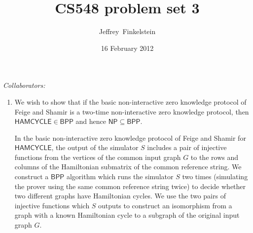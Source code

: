 \documentclass[draft]{article}
\author{Jef{}frey~Finkelstein}
\date{16 February 2012}
\title{CS548 problem set 3}
\newcommand{\collaborators}[1]{\emph{Collaborators: #1}}
\newcommand{\class}[1]{{\ensuremath{\mathsf{#1}}}}
\newcommand{\lang}[1]{{\ensuremath{\mathsf{#1}}}}
\newcommand{\BPP}{\class{BPP}}
\newcommand{\NP}{\class{NP}}
\begin{document}
\maketitle
\collaborators{}
\begin{enumerate}
\item
  We wish to show that if the basic non-interactive zero knowledge protocol of Feige and Shamir is a two-time non-interactive zero knowledge protocol, then $\lang{HAMCYCLE}\in\BPP$ and hence $\NP\subseteq\BPP$.

  In the basic non-interactive zero knowledge protocol of Feige and Shamir for \lang{HAMCYCLE}, the output of the simulator $S$ includes a pair of injective functions from the vertices of the common input graph $G$ to the rows and columns of the Hamiltonian submatrix of the common reference string.
  We construct a $\BPP$ algorithm which runs the simulator $S$ two times (simulating the prover using the same common reference string twice) to decide whether two different graphs have Hamiltonian cycles.
  We use the two pairs of injective functions which $S$ outputs to construct an isomorphism from a graph with a known Hamiltonian cycle to a subgraph of the original input graph $G$.


\end{enumerate}
\end{document}
